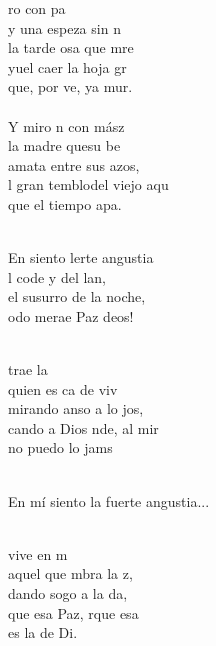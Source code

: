\begin{cancion}%
	ro con pa \\
	y una espeza sin n  \\
	la tarde osa que mre\\
	yuel caer  la hoja gr\\
	que, por ve, ya mur.\\
\jump\\
	Y miro n con mász\\
	la madre quesu be  \\
	amata entre sus azos,\\
	l gran temblodel viejo aqu\\
	que el tiempo apa. \\\jump\\
	\begin{chorus}%
	En siento lerte angustia\\
	l code y del lan, \\
	el susurro de la noche,\\
	odo merae Paz deos!\\
	\end{chorus}%
	\jump\\
	 trae la  \\
	quien es ca de viv  \\
	mirando anso a lo jos,\\
	cando a Dios nde, al mir\\
	no puedo lo jams\\\jump\\
	\begin{chorus}%
En mí siento la fuerte angustia...\\
	\end{chorus}%
	\jump\\
	vive en m \\
	aquel que mbra la z,  \\
	dando sogo a la da,\\
	que esa Paz, rque esa \\
	es la  de Di.\\
\end{cancion}%
